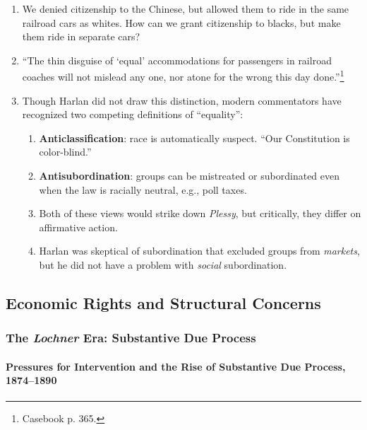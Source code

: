 \begin{enumerate}
\begin{enumerate}
        law.''\footnote{Casebook p. 364.} Law \emph{does} cause group 
        inequality.
        \item We denied citizenship to the Chinese, but allowed them to ride in 
        the same railroad cars as whites. How can we grant citizenship to 
        blacks, but make them ride in separate cars?
        \item ``The thin disguise of `equal' accommodations for passengers in 
        railroad coaches will not mislead any one, nor atone for the wrong this 
        day done.''\footnote{Casebook p. 365.}
        \item Though Harlan did not draw this distinction, modern commentators 
        have recognized two competing definitions of ``equality'':
        \begin{enumerate}
            \item \textbf{Anticlassification}: race is automatically suspect. 
            ``Our Constitution is color-blind.''
            \item \textbf{Antisubordination}: groups can be mistreated or 
            subordinated even when the law is racially neutral, e.g., poll 
            taxes.
            \item Both of these views would strike down \emph{Plessy}, but 
            critically, they differ on affirmative action.
            \item Harlan was skeptical of subordination that excluded groups 
            from \emph{markets}, but he did not have a problem with 
            \emph{social} subordination.
        \end{enumerate}
    \end{enumerate}
\end{enumerate}

\subsection{Economic Rights and Structural Concerns}

\subsubsection{The \emph{Lochner} Era: Substantive Due Process} 

\paragraph{Pressures for Intervention and the Rise of Substantive Due 
Process, 1874--1890}

